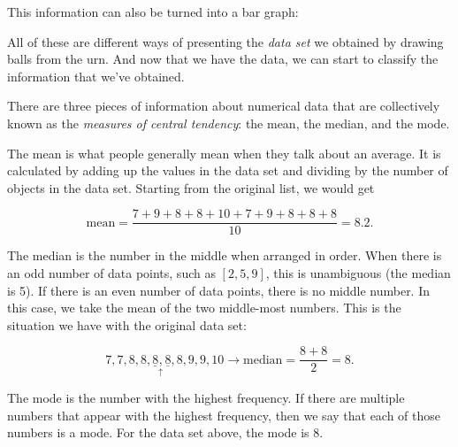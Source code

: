 \documentclass{ximera}
\begin{document}
This information can also be turned into a bar graph:

\begin{image}
\end{image}

All of these are different ways of presenting the \emph{data set} we obtained by drawing balls from the urn. And now that we have the data, we can start to classify the information that we've obtained.

There are three pieces of information about numerical data that are collectively known as the \emph{measures of central tendency}: the mean, the median, and the mode.

The mean is what people generally mean when they talk about an average. It is calculated by adding up the values in the data set and dividing by the number of objects in the data set. Starting from the original list, we would get

\[ \text{mean} = \dfrac{7 + 9 + 8 + 8 + 10 + 7 + 9 + 8 + 8 + 8}{10} = 8.2. \]

The median is the number in the middle when arranged in order. When there is an odd number of data points, such as $[2, 5, 9]$, this is unambiguous (the median is 5). If there is an even number of data points, there is no middle number. In this case, we take the mean of the two middle-most numbers. This is the situation we have with the original data set:

\[ 7, 7, 8, 8, \underline{8} \underset{\uparrow}{,} \underline{8}, 8, 9, 9, 10 \rightarrow \text{median} = \dfrac{8 + 8}{2} = 8. \]

The mode is the number with the highest frequency. If there are multiple numbers that appear with the highest frequency, then we say that each of those numbers is a mode. For the data set above, the mode is 8.
\end{document}
